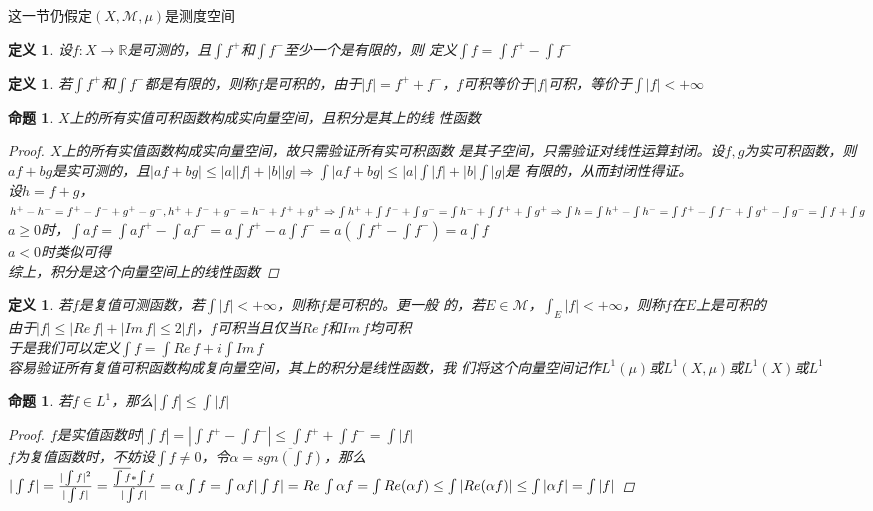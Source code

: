 \documentclass[12pt, a4paper, oneside]{ctexbook}
\newtheorem{definition}[theorem]{定义}
\newtheorem{proposition}[theorem]{命题}
\begin{document}
这一节仍假定$(X,\mathcal{M},\mu)$是测度空间
\begin{definition}
    设$f:X\to \mathbb{R}$是可测的，且$\int f^+$和$\int f^-$至少一个是有限的，则
    定义$\int f=\int f^+-\int f^-$
\end{definition}
\begin{definition}
    若$\int f^+$和$\int f^-$都是有限的，则称$f$是可积的，由于$|f|=f^++
    f^-$，$f$可积等价于$|f|$可积，等价于$\int |f|<+\infty$
\end{definition}
\begin{proposition}
    $X$上的所有实值可积函数构成实向量空间，且积分是其上的线
    性函数
    \begin{proof}
        $X$上的所有实值函数构成实向量空间，故只需验证所有实可积函数
        是其子空间，只需验证对线性运算封闭。设$f,g$为实可积函数，则
        $af+bg$是实可测的，且$|af+bg|\leq|a||f|+|b||g|\Rightarrow \int |af+bg|\leq |a|\int |f|+|b|\int |g|$是
        有限的，从而封闭性得证。\\
        设$h=f+g$，$h^+-h^-=f^+-f^-+g^+-g^-,\\
        h^++f^-+g^-=h^-+f^++g^+\\
        \Rightarrow \int h^++\int f^-+\int g^-=\int h^-+\int f^++\int g^+\\
        \Rightarrow \int h=\int h^+-\int h^-=\int f^+-\int f^-+\int g^+-\int g^-=\int f+\int g$\\
        $a\geq 0$时，$\int af=\int af^+-\int af^-=a\int f^+-a\int f^-=a(\int f^+-\int f^-)=a\int f $\\
        $a<0$时类似可得\\
        综上，积分是这个向量空间上的线性函数
    \end{proof}
\end{proposition}
\begin{definition}
    若$f$是复值可测函数，若$\int |f|<+\infty$，则称$f$是可积的。更一般
    的，若$E\in\mathcal{M}$，$\int_E|f|<+\infty$，则称$f$在$E$上是可积的\\
    由于$|f|\leq|Re\,f|+|Im\,f|\leq2|f|$，$f$可积当且仅当$Re\,f$和$Im\,f$均可积\\
    于是我们可以定义$\int f=\int Re\,f+i\int Im\,f$\\
    容易验证所有复值可积函数构成复向量空间，其上的积分是线性函数，我
    们将这个向量空间记作$L^1(\mu)$或$L^1(X,\mu)$或$L^1(X)$或$L^1$
\end{definition}
\begin{proposition}
    若$f\in L^1$，那么$|\int f|\leq\int |f|$
    \begin{proof}
        $f$是实值函数时$|\int f|=|\int f^+-\int f^-|\leq\int f^++\int f^-=\int |f|$\\
        $f$为复值函数时，不妨设$\int f\neq 0$，令$\alpha=\overline{sgn(\int f)}$，那么$|\int f|=\frac{|\int f|^2}{|\int f|}
        =\frac{\overline{\int f}*\int f}{|\int f|}=\alpha\int f=\int \alpha f\\
        |\int f|=Re\,\int \alpha f=\int Re(\alpha f)\leq\int|Re(\alpha f)|\leq\int|\alpha f|=\int|f|$
    \end{proof}
\end{proposition}
\end{document}
